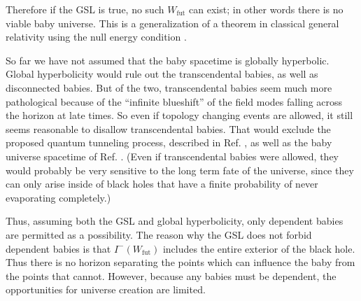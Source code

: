 \documentclass[12pt]{article}
\begin{document}
Therefore if the GSL is true, no such $W_\mathrm{fut}$ can exist; in other words there is no viable baby universe.  This is a generalization of a theorem in classical general relativity using the null energy condition \cite{obstacle}.


So far we have not assumed that the baby spacetime is globally hyperbolic.  Global hyperbolicity would rule out the transcendental babies, as well as disconnected babies.  But of the two, transcendental babies seem much more pathological because of the ``infinite blueshift'' of the field modes falling across the horizon at late times.  So even if topology changing events are allowed, it still seems reasonable to disallow transcendental babies.  That would exclude the proposed quantum tunneling process, described in Ref. \cite{monopole}, as well as the baby universe spacetime of Ref. \cite{FMM}.  (Even if transcendental babies were allowed, they would probably be very sensitive to the long term fate of the universe, since they can only arise inside of black holes that have a finite probability of never evaporating completely.)

Thus, assuming both the GSL and global hyperbolicity, only dependent babies are permitted as a possibility.  The reason why the GSL does not forbid dependent babies is that $I^-(W_\mathrm{fut})$ includes the entire exterior of the black hole.  Thus there is no horizon separating the points which can influence the baby from the points that cannot.  However, because any babies must be dependent, the opportunities for universe creation are limited.
\end{document}
